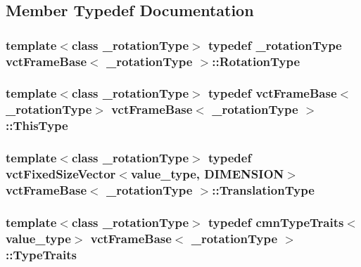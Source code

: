 \subsection{Member Typedef Documentation}
\hypertarget{classvct_frame_base_a02e4eaad478400dd1d81e772caf3b01b}{
\subsubsection[{Rotation\-Type}]{\setlength{\rightskip}{0pt plus 5cm}template$<$class \-\_\-rotation\-Type$>$ typedef \-\_\-rotation\-Type {\bf vct\-Frame\-Base}$<$ \-\_\-rotation\-Type $>$\-::{\bf Rotation\-Type}}}\label{classvct_frame_base_a02e4eaad478400dd1d81e772caf3b01b}
\hypertarget{classvct_frame_base_a076f1fe4fc957faa0d1ff7450d1cb768}{
\subsubsection[{This\-Type}]{\setlength{\rightskip}{0pt plus 5cm}template$<$class \-\_\-rotation\-Type$>$ typedef {\bf vct\-Frame\-Base}$<$\-\_\-rotation\-Type$>$ {\bf vct\-Frame\-Base}$<$ \-\_\-rotation\-Type $>$\-::{\bf This\-Type}}}\label{classvct_frame_base_a076f1fe4fc957faa0d1ff7450d1cb768}
\hypertarget{classvct_frame_base_a4c397a93b65f0c38e75e99ff3a659c23}{
\subsubsection[{Translation\-Type}]{\setlength{\rightskip}{0pt plus 5cm}template$<$class \-\_\-rotation\-Type$>$ typedef {\bf vct\-Fixed\-Size\-Vector}$<$value\-\_\-type, {\bf D\-I\-M\-E\-N\-S\-I\-O\-N}$>$ {\bf vct\-Frame\-Base}$<$ \-\_\-rotation\-Type $>$\-::{\bf Translation\-Type}}}\label{classvct_frame_base_a4c397a93b65f0c38e75e99ff3a659c23}
\hypertarget{classvct_frame_base_adfad078285c2712e6acd80fcbfbf5dec}{
\subsubsection[{Type\-Traits}]{\setlength{\rightskip}{0pt plus 5cm}template$<$class \-\_\-rotation\-Type$>$ typedef {\bf cmn\-Type\-Traits}$<$value\-\_\-type$>$ {\bf vct\-Frame\-Base}$<$ \-\_\-rotation\-Type $>$\-::{\bf Type\-Traits}}}\label{classvct_frame_base_adfad078285c2712e6acd80fcbfbf5dec}


